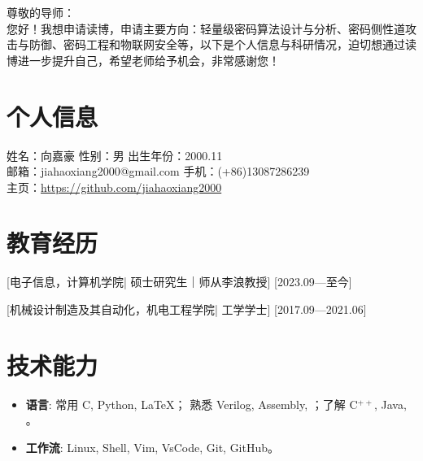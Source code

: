 \documentclass{resume}
\begin{document}
{
  \Large %
  \noindent
  尊敬的导师：\\

  您好！我想申请读博，申请主要方向：轻量级密码算法设计与分析、密码侧性道攻击与防御、密码工程和物联网安全等，以下是个人信息与科研情况，迫切想通过读博进一步提升自己，希望老师给予机会，非常感谢您！
  \vspace{1em}
  \normalsize %
}

\section{个人信息}
{
  \noindent
  姓名：向嘉豪 \quad 性别：男 \quad 出生年份：2000.11 \\
  邮箱：jiahaoxiang2000@gmail.com \quad 手机：(+86)13087286239 \\
  主页：\url{https://github.com/jiahaoxiang2000}
}



\section[教育经历]{教育经历}
[\textnormal{电子信息，计算机学院|}  硕士研究生｜师从李浪教授]
[2023.09—至今]

[\textnormal{机械设计制造及其自动化，机电工程学院|} 工学学士]
[2017.09—2021.06]

\section[技术能力]{技术能力\protect}
\begin{itemize}
  \item \textbf{语言}: 常用 C, Python, \LaTeX； 熟悉 Verilog, Assembly, ；了解 C$^{++}$, Java, 。
  \item \textbf{工作流}: Linux, Shell, Vim, VsCode,  Git, GitHub。
\end{itemize}
\end{document}
